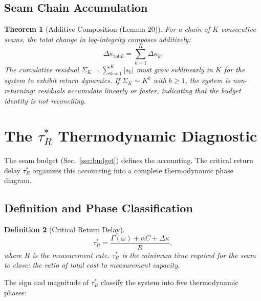 \documentclass[
  aps,
  prd,
  preprint,
  superscriptaddress,
  nofootinbib,
  floatfix,
  longbibliography
]{revtex4-2}
\newtheorem{theorem}{Theorem}
\newtheorem{definition}[theorem]{Definition}
\newcommand{\tRstar}{\tau_{\!R}^{*}}
\newcommand{\Gam}{\Gamma}
\newcommand{\beq}{\begin{equation}}
\newcommand{\eeq}{\end{equation}}
\newcommand{\Drft}{\omega}
\newcommand{\Curv}{C}
\newcommand{\Logint}{\kappa}
\begin{document}
\subsection{Seam Chain Accumulation}

\begin{theorem}[Additive Composition (Lemma 20)]\label{thm:chain}
For a chain of $K$ consecutive seams, the total change
in log-integrity composes additively:
\beq
  \Delta\Logint_{\mathrm{total}} = \sum_{k=1}^{K}
    \Delta\Logint_k.
\eeq
The cumulative residual $\Sigma_K = \sum_{k=1}^K |s_k|$
must grow sublinearly in $K$ for the system to exhibit
return dynamics.
If $\Sigma_K \sim K^b$ with $b \geq 1$, the system is
non-returning: residuals accumulate linearly or faster,
indicating that the budget identity is not reconciling.
\end{theorem}

\section{The $\tRstar$ Thermodynamic Diagnostic}\label{sec:tauRstar}

The seam budget (Sec.~\ref{sec:budget}) defines the
accounting.
The critical return delay $\tRstar$ organizes this
accounting into a complete thermodynamic phase diagram.

\subsection{Definition and Phase Classification}

\begin{definition}[Critical Return Delay]\label{def:tRstar}
\beq
  \tRstar = \frac{\Gam(\Drft) + \alpha\Curv + \Delta\Logint}{R},
\eeq
where $R$ is the measurement rate.
$\tRstar$ is the minimum time required for the seam to close:
the ratio of total cost to measurement capacity.
\end{definition}

The sign and magnitude of $\tRstar$ classify the system
into five thermodynamic phases:
\end{document}

